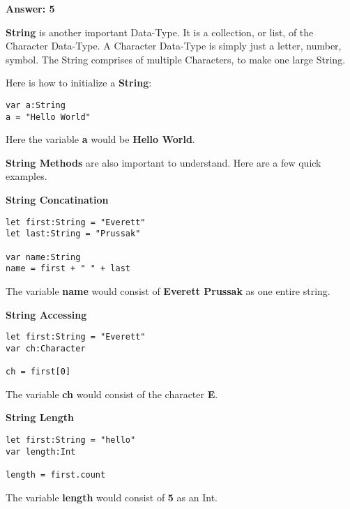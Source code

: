 \documentclass{article}
\theoremstyle{theorem}
\theoremstyle{definition}
\theoremstyle{remark}
\begin{document}
\noindent\newline\textbf{Answer: 5}

\noindent\newline\newline\textbf{String} is another important Data-Type. It is a collection, or list, of the Character Data-Type. A Character Data-Type is simply just a letter, number, symbol. The String comprises of multiple Characters, to make one large String.

\noindent\newline Here is how to initialize a \textbf{String}:
\begin{verbatim}
var a:String
a = "Hello World"
\end{verbatim}

\noindent\newline Here the variable \textbf{a} would be \textbf{Hello World}. 

\noindent\newline\textbf{String Methods} are also important to understand. Here are a few quick examples.

\noindent\newline \textbf{String Concatination}
\begin{verbatim}
let first:String = "Everett"
let last:String = "Prussak"

var name:String
name = first + " " + last
\end{verbatim}
\noindent\newline The variable \textbf{name} would consist of \textbf{Everett Prussak} as one entire string.

\noindent\newline \textbf{String Accessing}
\begin{verbatim}
let first:String = "Everett"
var ch:Character

ch = first[0]
\end{verbatim}
\noindent\newline The variable \textbf{ch} would consist of the character \textbf{E}.

\noindent\newline \textbf{String Length}
\begin{verbatim}
let first:String = "hello"
var length:Int

length = first.count
\end{verbatim}
\noindent\newline The variable \textbf{length} would consist of \textbf{5} as an Int.
\end{document}
